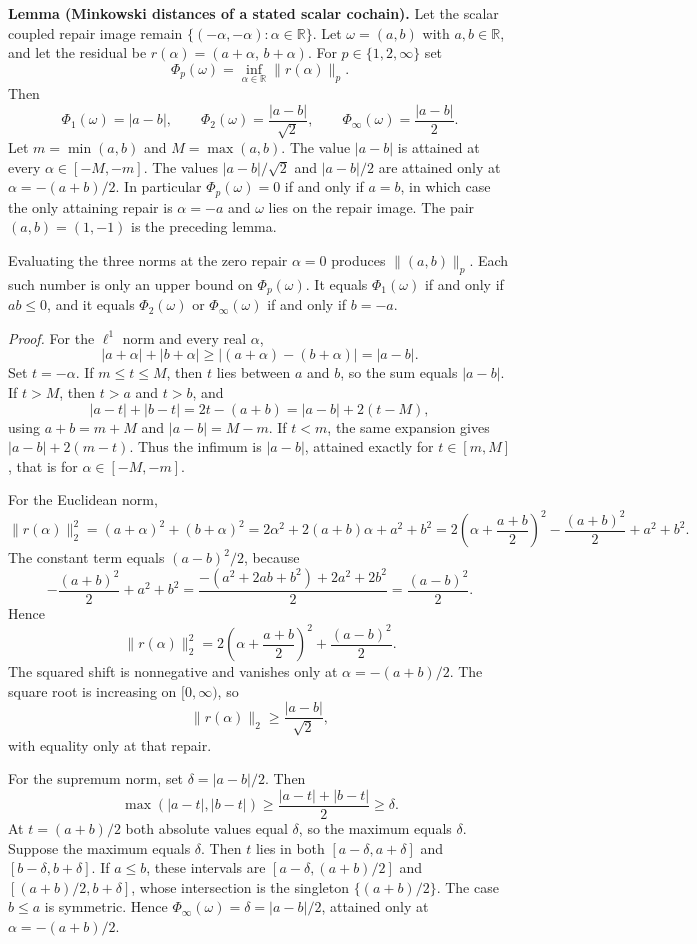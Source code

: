 \documentclass[
  11pt,
]{article}
\theoremstyle{plain}
\theoremstyle{definition}\newtheorem{definition}[theorem]{Definition}
\theoremstyle{remark}\newtheorem*{remark}{Remark}
\begin{document}
\textbf{Lemma (Minkowski distances of a stated scalar cochain).} Let the
scalar coupled repair image remain
\(\{(-\alpha,-\alpha):\alpha\in\mathbb R\}\). Let \(\omega=(a,b)\) with
\(a,b\in\mathbb R\), and let the residual be
\(r(\alpha)=(a+\alpha,\,b+\alpha)\). For \(p\in\{1,2,\infty\}\) set
\[\Phi_p(\omega)=\inf_{\alpha\in\mathbb R}\|r(\alpha)\|_p.\] Then
\[\Phi_1(\omega)=|a-b|,\qquad\Phi_2(\omega)=\frac{|a-b|}{\sqrt{2}},\qquad\Phi_\infty(\omega)=\frac{|a-b|}{2}.\]
Let \(m=\min(a,b)\) and \(M=\max(a,b)\). The value \(|a-b|\) is attained
at every \(\alpha\in[-M,-m]\). The values \(|a-b|/\sqrt{2}\) and
\(|a-b|/2\) are attained only at \(\alpha=-(a+b)/2\). In particular
\(\Phi_p(\omega)=0\) if and only if \(a=b\), in which case the only
attaining repair is \(\alpha=-a\) and \(\omega\) lies on the repair
image. The pair \((a,b)=(1,-1)\) is the preceding lemma.

Evaluating the three norms at the zero repair \(\alpha=0\) produces
\(\|(a,b)\|_p\). Each such number is only an upper bound on
\(\Phi_p(\omega)\). It equals \(\Phi_1(\omega)\) if and only if
\(ab\le 0\), and it equals \(\Phi_2(\omega)\) or \(\Phi_\infty(\omega)\)
if and only if \(b=-a\).

\emph{Proof.} For the \(\ell^1\) norm and every real \(\alpha\),
\[|a+\alpha|+|b+\alpha|\ge|(a+\alpha)-(b+\alpha)|=|a-b|.\] Set
\(t=-\alpha\). If \(m\le t\le M\), then \(t\) lies between \(a\) and
\(b\), so the sum equals \(|a-b|\). If \(t>M\), then \(t>a\) and
\(t>b\), and \[|a-t|+|b-t|=2t-(a+b)=|a-b|+2(t-M),\] using \(a+b=m+M\)
and \(|a-b|=M-m\). If \(t<m\), the same expansion gives
\(|a-b|+2(m-t)\). Thus the infimum is \(|a-b|\), attained exactly for
\(t\in[m,M]\), that is for \(\alpha\in[-M,-m]\).

For the Euclidean norm,
\[\|r(\alpha)\|_2^2=(a+\alpha)^2+(b+\alpha)^2=2\alpha^2+2(a+b)\alpha+a^2+b^2=2\left(\alpha+\frac{a+b}{2}\right)^2-\frac{(a+b)^2}{2}+a^2+b^2.\]
The constant term equals \((a-b)^2/2\), because
\[-\frac{(a+b)^2}{2}+a^2+b^2=\frac{-(a^2+2ab+b^2)+2a^2+2b^2}{2}=\frac{(a-b)^2}{2}.\]
Hence
\[\|r(\alpha)\|_2^2=2\left(\alpha+\frac{a+b}{2}\right)^2+\frac{(a-b)^2}{2}.\]
The squared shift is nonnegative and vanishes only at
\(\alpha=-(a+b)/2\). The square root is increasing on \([0,\infty)\), so
\[\|r(\alpha)\|_2\ge\frac{|a-b|}{\sqrt{2}},\] with equality only at that
repair.

For the supremum norm, set \(\delta=|a-b|/2\). Then
\[\max(|a-t|,|b-t|)\ge\frac{|a-t|+|b-t|}{2}\ge\delta.\] At \(t=(a+b)/2\)
both absolute values equal \(\delta\), so the maximum equals \(\delta\).
Suppose the maximum equals \(\delta\). Then \(t\) lies in both
\([a-\delta,a+\delta]\) and \([b-\delta,b+\delta]\). If \(a\le b\),
these intervals are \([a-\delta,(a+b)/2]\) and \([(a+b)/2,b+\delta]\),
whose intersection is the singleton \(\{(a+b)/2\}\). The case \(b\le a\)
is symmetric. Hence \(\Phi_\infty(\omega)=\delta=|a-b|/2\), attained
only at \(\alpha=-(a+b)/2\).
\end{document}

